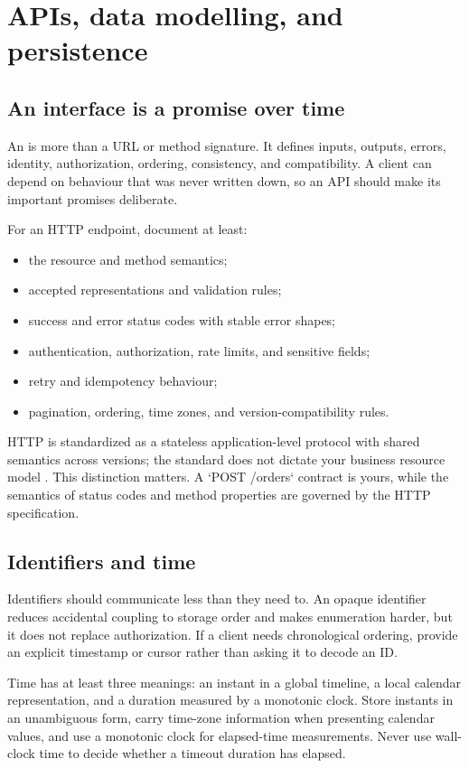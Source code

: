 \chapter{APIs, data modelling, and persistence}

\section{An interface is a promise over time}
An  is more than a URL or method signature. It defines inputs, outputs,
errors, identity, authorization, ordering, consistency, and compatibility. A
client can depend on behaviour that was never written down, so an API should
make its important promises deliberate.

For an HTTP endpoint, document at least:

\begin{itemize}
  \item the resource and method semantics;
  \item accepted representations and validation rules;
  \item success and error status codes with stable error shapes;
  \item authentication, authorization, rate limits, and sensitive fields;
  \item retry and idempotency behaviour;
  \item pagination, ordering, time zones, and version-compatibility rules.
\end{itemize}

HTTP is standardized as a stateless application-level protocol with shared
semantics across versions; the standard does not dictate your business resource
model \cite{ietf2022http}. This distinction matters. A `POST /orders` contract
is yours, while the semantics of status codes and method properties are governed
by the HTTP specification.

\section{Identifiers and time}
Identifiers should communicate less than they need to. An opaque identifier
reduces accidental coupling to storage order and makes enumeration harder, but
it does not replace authorization. If a client needs chronological ordering,
provide an explicit timestamp or cursor rather than asking it to decode an ID.

Time has at least three meanings: an instant in a global timeline, a local
calendar representation, and a duration measured by a monotonic clock. Store
instants in an unambiguous form, carry time-zone information when presenting
calendar values, and use a monotonic clock for elapsed-time measurements. Never
use wall-clock time to decide whether a timeout duration has elapsed.

